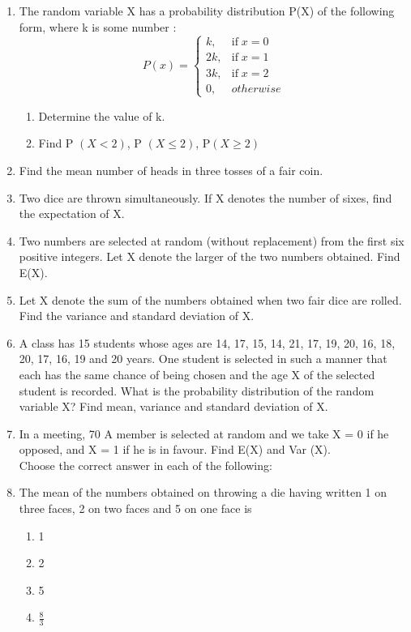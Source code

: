 \begin{enumerate}[label=\thechapter.\arabic*,ref=\thechapter.\theenumi]
\begin{enumerate}
\end{enumerate}

\item The random variable X has a probability distribution P(X) of the following form,
where k is some number :
\[P(x)=\begin{cases}
k, & \mbox{if}\; x= 0\\
2k, & \mbox{if}\; x= 1\\
3k, & \mbox{if}\; x= 2\\
0, & otherwise
\end{cases}\]
\begin{enumerate}
\item Determine the value of k.
\item Find P $(X < 2)$, P $(X \leq 2)$, P$(X \geq 2)$
\end{enumerate}
\item Find the mean number of heads in three tosses of a fair coin.

\item Two dice are thrown simultaneously. If X denotes the number of sixes, find the
expectation of X.

\item Two numbers are selected at random (without replacement) from the first six
positive integers. Let X denote the larger of the two numbers obtained. Find
E(X).

\item Let X denote the sum of the numbers obtained when two fair dice are rolled.
Find the variance and standard deviation of X.

\item A class has 15 students whose ages are 14, 17, 15, 14, 21, 17, 19, 20, 16, 18, 20,
17, 16, 19 and 20 years. One student is selected in such a manner that each has
the same chance of being chosen and the age X of the selected student is
recorded. What is the probability distribution of the random variable X? Find
mean, variance and standard deviation of X.

\item In a meeting, 70%
A member is selected at random and we take X = 0 if he opposed, and X = 1 if
he is in favour. Find E(X) and Var (X).\\

Choose the correct answer in each of the following:



\item The mean of the numbers obtained on throwing a die having written 1 on three
faces, 2 on two faces and 5 on one face is
\begin{enumerate}
\item 1
\item 2
\item 5
\item $\frac{8}{3}$


\end{enumerate}
\end{enumerate}
